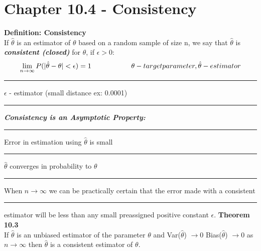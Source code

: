 \documentclass[]{article}
\begin{document}
\section{Chapter 10.4 - Consistency}
\Large\textbf{Definition: Consistency}
\\
\Large If $\hat\theta$ is an estimator of $\theta$ based on a random sample of size n, we say that $\hat\theta$ is \textbf{\textit{consistent (closed)}} for $\theta$, if $\epsilon > 0$:   
\newline \[ \lim_{n\to\infty} P( |  \hat\theta - \theta | < \epsilon) = 1   \Large\rule{2cm}{0pt}  \theta - target parameter,  \hat\theta - estimator \] 
\Large\rule{9cm}{0pt}  $\epsilon$ - estimator (small distance ex: 0.0001)
\newline
\newline 
\Large\rule{1cm}{0pt}\textbf{\textit{Consistency is an Asymptotic Property:}}
\newline\Large\rule{1cm}{0pt} Error in estimation using $\hat\theta$ is small 
\newline\Large\rule{1cm}{0pt} $\hat\theta$ converges in probability to $\theta$
\newline\Large\rule{1cm}{0pt} When ${n\to\infty}$ we can be practically certain that the error made with a consistent 
\newline\Large\rule{1cm}{0pt} estimator will be less than any small preassigned positive constant $\epsilon$.
\newline
\newline 
\Large\textbf{Theorem 10.3   }
\\
\Large If $\hat\theta$ is an unbiased estimator of the parameter $\theta$ and  Var($\hat\theta$) $\to 0$ Bias($\hat\theta$) $\to 0$ as  ${n\to\infty}$ then $\hat\theta$ is a consistent estimator of $\theta$.


\newpage
\end{document}
